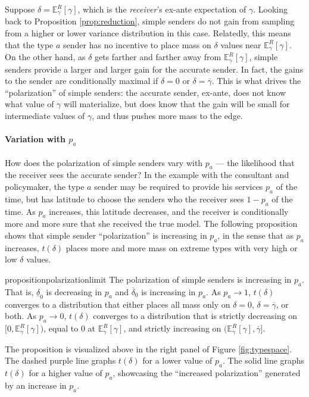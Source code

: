 \documentclass[11pt,dvipsnames]{article}
\begin{document}
Suppose $\delta = \mathbb{E}_\gamma^R[\gamma]$, which is the \emph{receiver}'s ex-ante expectation of $\gamma$.
Looking back to Proposition \ref{prop:reduction}, simple senders do not gain from sampling from a higher or lower variance distribution in this case.
Relatedly, this means that the type $a$ sender has no incentive to place mass on $\delta$ values near $\mathbb{E}_\gamma^R[\gamma]$.
On the other hand, as $\delta$ gets farther and farther away from $\mathbb{E}_\gamma^R[\gamma]$, simple senders provide a larger and larger gain for the accurate sender.
In fact, the gains to the sender are conditionally maximal if $\delta = 0$ or $\delta = \overline{\gamma}$.
This is what drives the ``polarization'' of simple senders: the accurate sender, ex-ante, does not know what value of $\gamma$ will materialize, but does know that the gain will be small for intermediate values of $\gamma$, and thus pushes more mass to the edge.

\paragraph{Variation with $p_a$} How does the polarization of simple senders vary with $p_a$ --- the likelihood that the receiver sees the accurate sender?
In the example with the consultant and policymaker, the type $a$ sender may be required to provide his services $p_a$ of the time, but has latitude to choose the senders who the receiver sees $1-p_a$ of the time.
As $p_a$ increases, this latitude decreases, and the receiver is conditionally more and more sure that she received the true model. 
The following proposition shows that simple sender ``polarization'' is increasing in $p_a$, in the sense that as $p_a$ increases, $t(\delta)$ places more and more mass on extreme types with very high or low $\delta$ values.
\begin{restatable}{proposition}{polarizationlimit}
The polarization of simple senders is increasing in $p_a$. That is, $\underline{\delta}_0$ is decreasing in $p_a$ and $\overline{\delta}_0$ is increasing in $p_a$.
As $p_a \to 1$, $t(\delta)$ converges to a distribution that either places all mass only on $\delta = 0$, $\delta = \overline{\gamma}$, or both.
As $p_a \to 0$, $t(\delta)$ converges to a distribution that is strictly decreasing on $[0,\mathbb{E}_\gamma^R[\gamma])$, equal to $0$ at $\mathbb{E}_\gamma^R[\gamma]$, and strictly increasing on $(\mathbb{E}_\gamma^R[\gamma],\overline{\gamma}]$.
\label{prop:polarizationlimit}
\end{restatable}
The proposition is visualized above in the right panel of Figure \ref{fig:typespace}. The dashed purple line graphs $t(\delta)$ for a lower value of $p_a$. The solid line graphs $t(\delta)$ for a higher value of $p_a$, showcasing the ``increased polarization'' generated by an increase in $p_a$.
\end{document}
